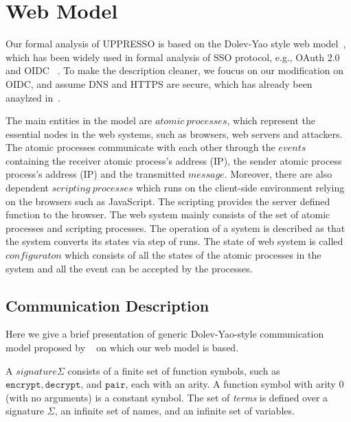 \section{Web Model}

Our formal analysis of UPPRESSO is based on the Dolev-Yao style web model~\cite{SPRESSO}, which has been widely used in formal analysis of SSO protocol, e.g., OAuth 2.0~\cite{FettKS16} and OIDC ~\cite{FettKS17}.
To make the description cleaner, we foucus on our modification on OIDC, and assume DNS and HTTPS are secure, which has already been anaylzed in~\cite{SPRESSO}.

The main entities in the model are $atomic\ processes$, which represent the essential nodes in the web systems, such as browsers, web servers and attackers. The atomic processes communicate with each other through the $events$ containing the receiver atomic process's address (IP), the sender atomic process process's address (IP) and the transmitted $message$. Moreover, there are also dependent $scripting\ processes$ which runs on the client-side environment relying on the browsers such as JavaScript. The scripting provides the server defined function to the browser.  The web system mainly consists of the set of atomic processes and scripting processes. The operation of a system is described as that the system converts its states via step of runs. The state of web system is called $configuraton$ which consists of all the states of the atomic processes in the system and all the event can be accepted by the processes.

\subsection{Communication Description}
Here we give a brief  presentation of generic Dolev-Yao-style communication model proposed by ~\cite{SPRESSO} on which our web model  is based. 


A $signature \Sigma$ consists of a finite set of function symbols, such as $\mathtt{encrypt}, \mathtt{decrypt}$, and $\mathtt{pair}$, each with an arity. A function symbol with arity 0 (with no arguments)  is a constant symbol.
The set of \emph{terms} is defined over a signature $\Sigma$, an infinite set of names, and an infinite set of variables.



